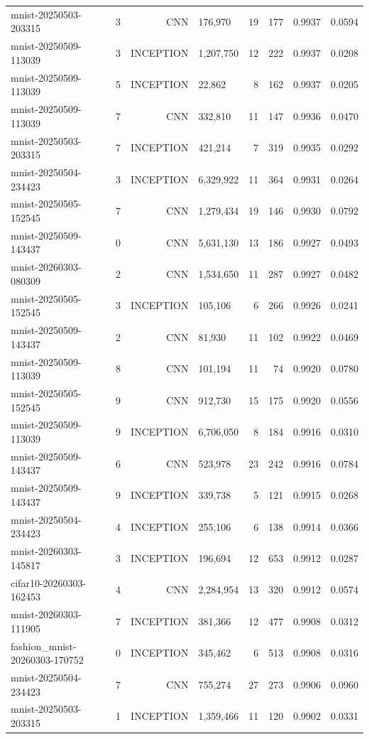 \begin{tabular}{llrlrrrr}
mnist-20250503-203315 & 3 & CNN & 176,970 & 19 & 177 & 0.9937 & 0.0594 \\
mnist-20250509-113039 & 3 & INCEPTION & 1,207,750 & 12 & 222 & 0.9937 & 0.0208 \\
mnist-20250509-113039 & 5 & INCEPTION & 22,862 & 8 & 162 & 0.9937 & 0.0205 \\
mnist-20250509-113039 & 7 & CNN & 332,810 & 11 & 147 & 0.9936 & 0.0470 \\
mnist-20250503-203315 & 7 & INCEPTION & 421,214 & 7 & 319 & 0.9935 & 0.0292 \\
mnist-20250504-234423 & 3 & INCEPTION & 6,329,922 & 11 & 364 & 0.9931 & 0.0264 \\
mnist-20250505-152545 & 7 & CNN & 1,279,434 & 19 & 146 & 0.9930 & 0.0792 \\
mnist-20250509-143437 & 0 & CNN & 5,631,130 & 13 & 186 & 0.9927 & 0.0493 \\
mnist-20260303-080309 & 2 & CNN & 1,534,650 & 11 & 287 & 0.9927 & 0.0482 \\
mnist-20250505-152545 & 3 & INCEPTION & 105,106 & 6 & 266 & 0.9926 & 0.0241 \\
mnist-20250509-143437 & 2 & CNN & 81,930 & 11 & 102 & 0.9922 & 0.0469 \\
mnist-20250509-113039 & 8 & CNN & 101,194 & 11 & 74 & 0.9920 & 0.0780 \\
mnist-20250505-152545 & 9 & CNN & 912,730 & 15 & 175 & 0.9920 & 0.0556 \\
mnist-20250509-113039 & 9 & INCEPTION & 6,706,050 & 8 & 184 & 0.9916 & 0.0310 \\
mnist-20250509-143437 & 6 & CNN & 523,978 & 23 & 242 & 0.9916 & 0.0784 \\
mnist-20250509-143437 & 9 & INCEPTION & 339,738 & 5 & 121 & 0.9915 & 0.0268 \\
mnist-20250504-234423 & 4 & INCEPTION & 255,106 & 6 & 138 & 0.9914 & 0.0366 \\
mnist-20260303-145817 & 3 & INCEPTION & 196,694 & 12 & 653 & 0.9912 & 0.0287 \\
cifar10-20260303-162453 & 4 & CNN & 2,284,954 & 13 & 320 & 0.9912 & 0.0574 \\
mnist-20260303-111905 & 7 & INCEPTION & 381,366 & 12 & 477 & 0.9908 & 0.0312 \\
fashion_mnist-20260303-170752 & 0 & INCEPTION & 345,462 & 6 & 513 & 0.9908 & 0.0316 \\
mnist-20250504-234423 & 7 & CNN & 755,274 & 27 & 273 & 0.9906 & 0.0960 \\
mnist-20250503-203315 & 1 & INCEPTION & 1,359,466 & 11 & 120 & 0.9902 & 0.0331 \\

\end{tabular}
